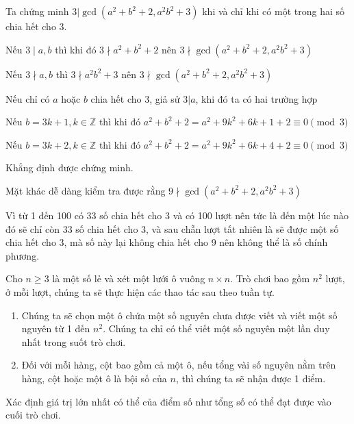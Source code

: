 \documentclass[11pt]{scrartcl}
\begin{document}
\begin{itemize}[label=, leftmargin=0em, itemsep=0.5em]
    
\begin{sol}
    Ta chứng minh $3 | \gcd(a^2 + b^2 + 2,a^2b^2 + 3)$ khi và chỉ khi có một trong hai số chia hết cho $3$.
    
    Nếu $3 \mid a,b$ thì khi đó $3\nmid a^2 + b^2 + 2$ nên $3 \nmid \gcd(a^2 + b^2 + 2, a^2b^2 + 3)$
  
  
    Nếu $3 \nmid a,b$ thì $3\nmid a^2b^2 +3$ nên $3 \nmid \gcd(a^2 + b^2 + 2, a^2b^2 + 3)$
  
  
    Nếu chỉ có $a$ hoặc $b$ chia hết cho $3$, giả sử $3 | a$, khi đó ta có hai trường hợp
  
  
    Nếu $b = 3k + 1, k \in \mathbb{Z}$ thì khi đó $a^2 + b^2 + 2 = a^2 + 9k^2 + 6k + 1 + 2 \equiv 0 \pmod{3}$
  
  
    Nếu $b = 3k + 2, k \in \mathbb{Z}$ thì khi đó $a^2 + b^2 + 2 = a^2 +9k^2 + 6k + 4 + 2 \equiv 0 \pmod{3}$
  
  
    Khẳng định được chứng minh.
  
  
    Mặt khác dễ dàng kiểm tra được rằng $ 9 \nmid \gcd(a^2 + b^2 + 2, a^2b^2 + 3)$
  
  
    Vì từ 1 đến 100 có $33$ số chia hết cho 3 và có 100 lượt nên tức là đến một lúc nào đó sẽ chỉ còn $33$ số chia hết cho 3, và sau chẵn lượt tất nhiên là sẽ được một số chia hết cho 3, mà số này lại không chia hết cho 9 nên không thể là số chính phương.
  \end{sol}

    \begin{bt}
        Cho $n \geq 3$ là một số lẻ và xét một lưới ô vuông $n\times n$. Trò chơi bao gồm $n^2$ lượt, ở mỗi lượt, chúng ta sẽ thực hiện các thao tác sau theo tuần tự.
        \begin{enumerate}
            \item Chúng ta sẽ chọn một ô chứa một số nguyên chưa được viết và viết một số nguyên từ 1 đến $n^2$. Chúng ta chỉ có thể viết một số nguyên một lần duy nhất trong suốt trò chơi.
            \item Đối với mỗi hàng, cột bao gồm cả một ô, nếu tổng vài số nguyên  nằm trên hàng, cột hoặc một ô là bội số của $n$, thì chúng ta sẽ nhận được 1 điểm.
        \end{enumerate}
        Xác định giá trị lớn nhất có thể của điểm số như tổng số có thể đạt được vào cuối trò chơi.
    \end{bt}


\end{itemize}
\end{document}
